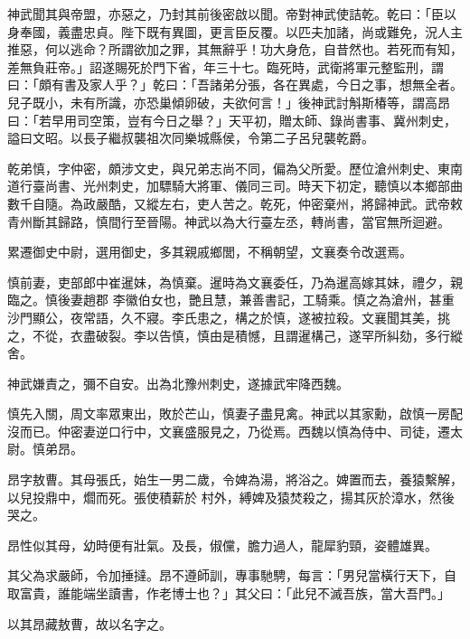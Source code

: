\begin{pinyinscope}
 神武聞其與帝盟，亦惡之，乃封其前後密啟以聞。帝對神武使詰乾。乾曰：「臣以身奉國，義盡忠貞。陛下既有異圖，更言臣反覆。以匹夫加諸，尚或難免，況人主推惡，何以逃命？所謂欲加之罪，其無辭乎！功大身危，自昔然也。若死而有知，差無負莊帝。」詔遂賜死於門下省，年三十七。臨死時，武衛將軍元整監刑，謂曰：「頗有書及家人乎？」乾曰：「吾諸弟分張，各在異處，今日之事，想無全者。兒子既小，未有所識，亦恐巢傾卵破，夫欲何言！」後神武討斛斯椿等，謂高昂曰：「若早用司空策，豈有今日之舉？」天平初，贈太師、錄尚書事、冀州刺史，
 謚曰文昭。以長子繼叔襲祖次同樂城縣侯，令第二子呂兒襲乾爵。



 乾弟慎，字仲密，頗涉文史，與兄弟志尚不同，偏為父所愛。歷位滄州刺史、東南道行臺尚書、光州刺史，加驃騎大將軍、儀同三司。時天下初定，聽慎以本鄉部曲數千自隨。為政嚴酷，又縱左右，吏人苦之。乾死，仲密棄州，將歸神武。武帝敕青州斷其歸路，慎間行至晉陽。神武以為大行臺左丞，轉尚書，當官無所迴避。



 累遷御史中尉，選用御史，多其親戚鄉閭，不稱朝望，文襄奏令改選焉。



 慎前妻，吏部郎中崔暹妹，為慎棄。暹時為文襄委任，乃為暹高嫁其妹，禮夕，親臨之。慎後妻趙郡
 李徽伯女也，艷且慧，兼善書記，工騎乘。慎之為滄州，甚重沙門顯公，夜常語，久不寢。李氏患之，構之於慎，遂被拉殺。文襄聞其美，挑之，不從，衣盡破裂。李以告慎，慎由是積憾，且謂暹構己，遂罕所糾劾，多行縱舍。



 神武嫌責之，彌不自安。出為北豫州刺史，遂據武牢降西魏。



 慎先入關，周文率眾東出，敗於芒山，慎妻子盡見禽。神武以其家勳，啟慎一房配沒而已。仲密妻逆口行中，文襄盛服見之，乃從焉。西魏以慎為侍中、司徒，遷太尉。慎弟昂。



 昂字敖曹。其母張氏，始生一男二歲，令婢為湯，將浴之。婢置而去，養猿繫解，以兒投鼎中，爓而死。張使積薪於
 村外，縛婢及猿焚殺之，揚其灰於漳水，然後哭之。



 昂性似其母，幼時便有壯氣。及長，俶儻，膽力過人，龍犀豹頸，姿體雄異。



 其父為求嚴師，令加捶撻。昂不遵師訓，專事馳騁，每言：「男兒當橫行天下，自取富貴，誰能端坐讀書，作老博士也？」其父曰：「此兒不滅吾族，當大吾門。」



 以其昂藏敖曹，故以名字之。




\end{pinyinscope}
